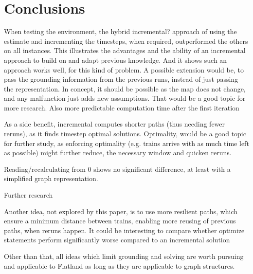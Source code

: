 \section{Conclusions}

When testing the environment, the hybrid \color{red}  incremental? \color{black} approach of using the estimate and incrementing the timesteps, when required, outperformed the others on all instances. This illustrates the advantages and the ability of an incremental approach to build on and adapt previous knowledge. And it shows such an approach works well, for this kind of problem. A possible extension would be, to pass the grounding information from the previous runs, instead of just passing the representation. In concept, it should be possible as the map does not change, and any malfunction just adds new assumptions. That would be a good topic for more research.\color{red}  Also more predictable computation time after the first iteration \color{black}

As a side benefit, incremental computes shorter paths (thus needing fewer reruns), as it finds timestep optimal solutions. Optimality, would be a good topic for further study, as enforcing optimality (e.g. trains arrive with as much time left as possible) might further reduce, the necessary window and quicken reruns.

\color{red}  Reading/recalculating from 0 shows no significant difference, at least with a simplified graph representation. \color{black}

\color{red}  Further research \color{black}

Another idea, not explored by this paper, is to use more resilient paths, which ensure a minimum distance between trains, enabling more reusing of previous paths, when reruns happen.  \color{red}  It could be interesting to compare whether optimize statements perform significantly worse compared to an incremental solution\color{black}

Other than that, all ideas which limit grounding and solving are worth pursuing and applicable to Flatland as long as they are applicable to graph structures.